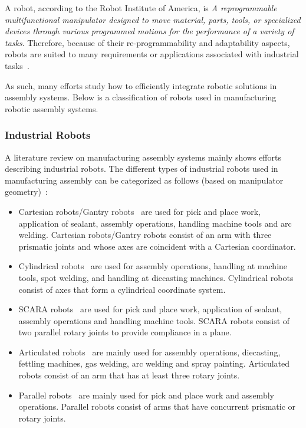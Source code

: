 A robot, according to the Robot Institute of America, is \emph{A reprogrammable multifunctional manipulator designed to move material, parts, tools, or specialized devices through various programmed motions for the performance of a variety of tasks}. Therefore, because of their re-programmability and adaptability aspects, robots are suited to many requirements or
applications associated with industrial tasks~\cite{Kumar.2012}.



As such, many efforts study how to efficiently integrate robotic solutions in assembly systems. Below is a classification of robots used in manufacturing robotic assembly systems.

\subsubsection{Industrial Robots}
A literature review on manufacturing assembly systems mainly shows efforts describing industrial robots. The different types of industrial robots used in manufacturing assembly can be categorized as follows (based on manipulator geometry)~\cite{industrial-robots}:
\begin{itemize}
\item Cartesian robots/Gantry robots~\cite{Majors.Gantry.1997} are used for pick and place work, application of sealant, assembly operations, handling machine tools and arc welding. Cartesian robots/Gantry robots consist of an arm with three prismatic joints and whose axes are coincident with a Cartesian coordinator.
\item Cylindrical robots~\cite{Geering.Cylindrical.1986} are used for assembly operations, handling at machine tools, spot welding, and handling at diecasting machines. Cylindrical robots consist of axes that form a cylindrical coordinate system.
\item SCARA robots~\cite{Yao.SCARA.1999} are used for pick and place work, application of sealant, assembly operations and handling machine tools. SCARA robots consist of two parallel rotary joints to provide compliance in a plane.
\item Articulated robots~\cite{Puiu.Articulated.2009} are mainly used for assembly operations, diecasting, fettling machines, gas welding, arc welding and spray painting. Articulated robots consist of an arm that has at least three rotary joints.
\item Parallel robots~\cite{Khalil.Parallel.2011} are mainly used for pick and place work and assembly operations. Parallel robots consist of arms that have concurrent prismatic or rotary joints.
\end{itemize}


